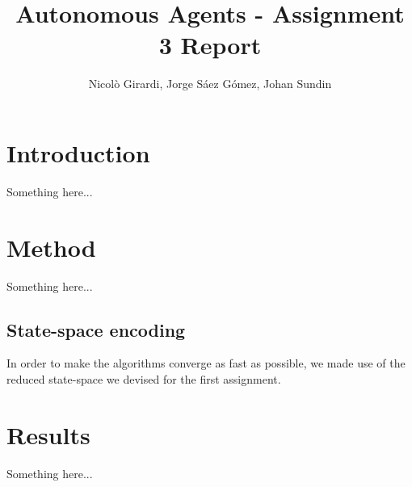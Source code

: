 \documentclass[a4paper,10pt]{article}
\title{Autonomous Agents - Assignment 3 Report}
\author{Nicolò Girardi, Jorge Sáez Gómez, Johan Sundin}
\begin{document}
\maketitle

\section{Introduction}

Something here...

\section{Method}

Something here...

\subsection{State-space encoding}

In order to make the algorithms converge as fast as possible, we made use of the reduced state-space we devised for the first assignment.

\section{Results}

Something here...
\end{document}
